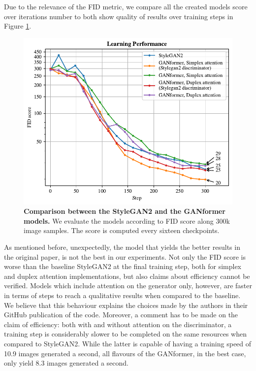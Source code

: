 \documentclass{article}
\begin{document}
Due to the relevance of the FID metric, we compare all the created models score over iterations 
number to both show quality of results over training steps in Figure \ref{fig:performance}.
\begin{figure}[htpb]				
	\centering
	\includegraphics[width=.6\linewidth]{FIDscore-cartoonset.pdf}
	\caption{\textbf{Comparison between the StyleGAN2 and the GANformer models.} We evaluate 
		the models according to FID score along 300k image samples. The score is computed every 
		sixteen checkpoints.}
	\label{fig:performance}
\end{figure}

As mentioned before, unexpectedly, the model that yields the better results in the original paper, is 
not the best in our experiments.
Not only the FID score is worse than the baseline StyleGAN2 at the final training step, both for 
simplex and duplex attention implementations, but also claims about efficiency cannot be verified.
Models which include attention on the generator only, however, are faster in terms of steps to reach a qualitative results when compared to the baseline.
We believe that this behaviour explains the choices made by the authors in their GitHub publication 
of the code.
Moreover, a comment has to be made on the claim of efficiency: both with and without attention on 
the discriminator, a training step is considerably slower to be completed on the same resources 
when compared to StyleGAN2.
While the latter is capable of having a training speed of 10.9 images generated a second, all flavours 
of the GANformer, in the best case, only yield 8.3 images generated a second.
\end{document}
